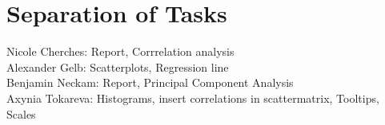 \documentclass{vgtc}                          %
\begin{document}
\section{Separation of Tasks}
Nicole Cherches: Report, Corrrelation analysis\\
Alexander Gelb: Scatterplots, Regression line\\
Benjamin Neckam: Report, Principal Component Analysis\\
Axynia Tokareva: Histograms, insert correlations in scattermatrix, Tooltips, Scales


\end{document}
